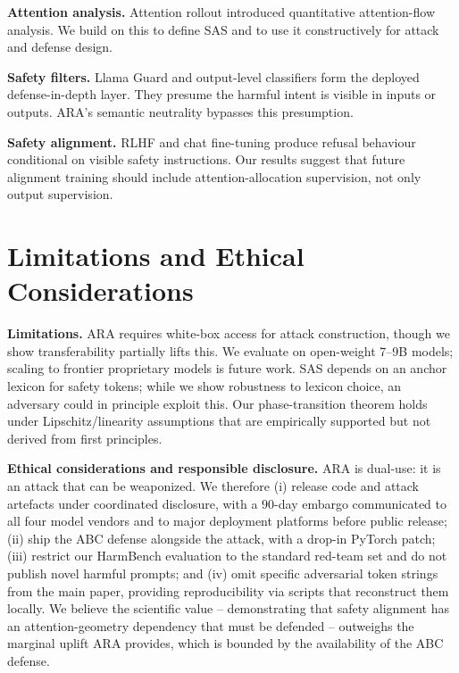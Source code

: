 \documentclass[sigconf,anonymous=false,review=false]{acmart}
\theoremstyle{definition}
\theoremstyle{remark}
\begin{document}
\textbf{Attention analysis.} Attention rollout \cite{abnar2020rollout} introduced quantitative attention-flow analysis. We build on this to define SAS and to use it constructively for attack and defense design.

\textbf{Safety filters.} Llama Guard \cite{inan2023llamaguard} and output-level classifiers form the deployed defense-in-depth layer. They presume the harmful intent is visible in inputs or outputs. ARA's semantic neutrality bypasses this presumption.

\textbf{Safety alignment.} RLHF \cite{ouyang2022training} and chat fine-tuning \cite{touvron2023llama2,grattafiori2024llama3,jiang2023mistral,gemmateam2024gemma2} produce refusal behaviour conditional on visible safety instructions. Our results suggest that future alignment training should include attention-allocation supervision, not only output supervision.

\section{Limitations and Ethical Considerations}
\label{sec:ethics}

\textbf{Limitations.} ARA requires white-box access for attack construction, though we show transferability partially lifts this. We evaluate on open-weight 7--9B models; scaling to frontier proprietary models is future work. SAS depends on an anchor lexicon for safety tokens; while we show robustness to lexicon choice, an adversary could in principle exploit this. Our phase-transition theorem holds under Lipschitz/linearity assumptions that are empirically supported but not derived from first principles.

\textbf{Ethical considerations and responsible disclosure.} ARA is dual-use: it is an attack that can be weaponized. We therefore (i) release code and attack artefacts under coordinated disclosure, with a $90$-day embargo communicated to all four model vendors and to major deployment platforms before public release; (ii) ship the ABC defense alongside the attack, with a drop-in PyTorch patch; (iii) restrict our HarmBench evaluation to the standard red-team set and do not publish novel harmful prompts; and (iv) omit specific adversarial token strings from the main paper, providing reproducibility via scripts that reconstruct them locally. We believe the scientific value -- demonstrating that safety alignment has an attention-geometry dependency that must be defended -- outweighs the marginal uplift ARA provides, which is bounded by the availability of the ABC defense.
\end{document}
